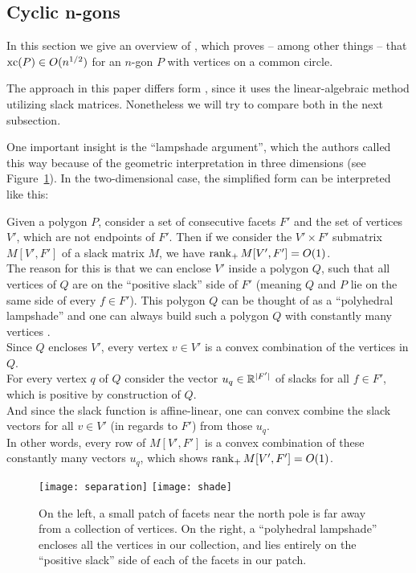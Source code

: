 \subsection{Cyclic n-gons}

In this section we give an overview of \cite{kwan2020extension}, which proves -- among other things -- that $\operatorname{xc}(P) \in O(n^{1/2})$ for an $n$-gon $P$ with vertices on a common circle.

The approach in this paper differs form \cite{shitov2020sublinear}, since it uses the linear-algebraic method utilizing slack matrices. Nonetheless we will try to compare both in the next subsection.

One important insight is the ``lampshade argument'', which the authors called this way because of the geometric interpretation in three dimensions (see Figure~\ref{fig:lampshade}). In the two-dimensional case, the simplified form can be interpreted like this:

Given a polygon $P$, consider a set of consecutive facets $F'$ and the set of vertices $V'$, which are not endpoints of $F'$. Then if we consider the $V' \times F'$ submatrix $M[V',F']$ of a slack matrix $M$, we have $\operatorname{rank}_+ M[V',F'] = O(1)$.\\
The reason for this is that we can enclose $V'$ inside a polygon $Q$, such that all vertices of $Q$ are on the ``positive slack'' side of $F'$ (meaning $Q$ and $P$ lie on the same side of every $f \in F'$). This polygon $Q$ can be thought of as a ``polyhedral lampshade'' and one can always build such a polygon $Q$ with constantly many vertices .\\
Since $Q$ encloses $V'$, every vertex $v \in V'$ is a convex combination of the vertices in $Q$.\\
For every vertex $q$ of $Q$ consider the vector $u_q \in \mathbb{R}^{\lvert F'\rvert}$ of slacks for all $f \in F'$, which is positive by construction of $Q$.\\
And since the slack function is affine-linear, one can convex combine the slack vectors for all $v \in V'$ (in regards to $F'$) from those $u_q$.\\
In other words, every row of $M[V',F']$ is a convex combination of these constantly many vectors $u_q$, which shows $\operatorname{rank}_+ M[V',F'] = O(1)$.

\begin{figure}[h]
  \centering
  \texttt{[image: separation]}
  \texttt{[image: shade]}
  \caption{On the left, a small patch of facets near the north pole is far away from a collection of vertices. On the right, a ``polyhedral lampshade'' encloses all the vertices in our collection, and lies entirely on the ``positive slack'' side of each of the facets in our patch. \cite[Figure 2]{kwan2020extension}}
  \label{fig:lampshade}
\end{figure}

